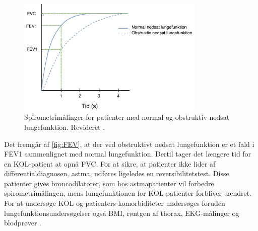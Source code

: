 \begin{figure} [H]
\centering
\includegraphics[width=0.8\textwidth]{figures/FEV}
\caption{Spirometrimålinger for patienter med normal og obstruktiv nedsat lungefunktion. Revideret \cite{Basisbogen2016}.}
\label{fig:FEV}
\end{figure} 

\noindent
Det fremgår af \autoref{fig:FEV}, at der ved obstruktivt nedsat lungefunktion er et fald i FEV1 sammenlignet med normal lungefunktion. Dertil tager det længere tid for en KOL-patient at opnå FVC. For at sikre, at patienter ikke lider af differentialdiagnosen, astma, udføres ligeledes en reversibilitetstest. Disse patienter gives broncodilatorer, som hos astmapatienter vil forbedre spirometrimålingen, mens lungefunktionen for KOL-patienter forbliver uændret.\cite{Basisbogen2016, Sundhed2013} 
For at undersøge KOL og patienters komorbiditeter undersøges foruden lungefunktionsundersøgelser også BMI, røntgen af thorax, EKG-målinger og blodprøver \cite{Sundhed2013}. 

